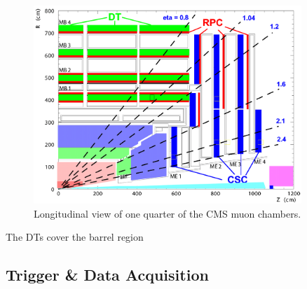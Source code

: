 \begin{figure}[hbtp]
 \begin{center}
   \includegraphics[width=0.9\textwidth]{cms_muonchamber.pdf}
   \caption[text in square brackets]{Longitudinal view of one quarter of the CMS muon chambers.}
   \label{fig:cms_muonchamber}
 \end{center}
\end{figure}

The DTs cover the barrel region
 
\subsection{Trigger & Data Acquisition}


%
% 
% 
